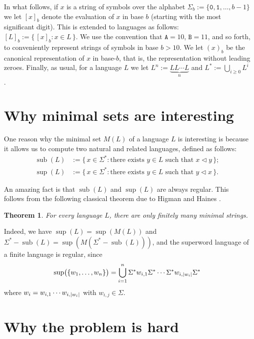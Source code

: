 \documentclass[12pt]{article}
\DeclarePairedDelimiter\abs{\lvert}{\rvert}
\DeclarePairedDelimiter\paren{\lparen}{\rparen}
\def\subw{\mathrel{\triangleleft}}
\DeclareMathOperator\supe{sup}
\DeclareMathOperator\subb{sub}
\theoremstyle{plain}
\newtheorem{theorem}{Theorem}
\theoremstyle{definition}
\theoremstyle{remark}
\newcommand{\0}{\mathtt{0}}
\newcommand{\1}{\mathtt{1}}
\newcommand{\2}{\mathtt{2}}
\newcommand{\3}{\mathtt{3}}
\newcommand{\4}{\mathtt{4}}
\newcommand{\5}{\mathtt{5}}
\newcommand{\6}{\mathtt{6}}
\newcommand{\7}{\mathtt{7}}
\newcommand{\8}{\mathtt{8}}
\newcommand{\9}{\mathtt{9}}
\newcommand{\A}{\mathtt{A}}
\newcommand{\B}{\mathtt{B}}
\newcommand{\set}[2]{\{\,#1{}:{}#2\,\}}
\begin{document}
In what follows, if $x$ is a string of symbols over the alphabet
$\Sigma_b := \lbrace \0, \1, \dotsc, b-1 \rbrace$ we let 
$[x]_b$ denote the evaluation of $x$ in base $b$ (starting with the
most significant digit).  This is extended to languages as follows:
$[L]_b := \set{ [x]_b }{ x \in L }$.
We use the convention that $\A = 10$, $\B = 11$, and so forth,
to conveniently represent strings of symbols in base $b > 10$.
We let $(x)_b$ be the canonical representation
of $x$ in base-$b$, that is, the representation without leading zeroes.
Finally, as usual, for a language $L$ we let
$L^n := \underbrace{LL\dotsm L}_n$ and $L^* := \bigcup_{i \geq 0} L^i$.

\section{Why minimal sets are interesting}

One reason why
the minimal set $M(L)$ of a language $L$ is interesting is because it
allows us to compute two natural and related languages,
defined as follows:
\begin{align*}
\subb(L) &:= \set{x \in \Sigma^*}{\text{there exists $y \in L$ such that $x \subw y$}} ; \\
\supe(L) &:= \set{x \in \Sigma^*}{\text{there exists $y \in L$ such that $y \subw x$}} .
\end{align*}

An amazing fact is that $\subb(L)$ and $\supe(L)$ are always regular.
This follows from
the following classical theorem due to Higman \cite{Hi52} and
Haines \cite{Ha69}.

\begin{theorem}
For every language $L$, there are only finitely many minimal strings.
\end{theorem}

Indeed, we have $\supe(L) = \supe(M(L))$
and $\Sigma^* - \subb(L) = \supe(M(\Sigma^* - \subb(L)))$, and
the superword language of a finite language is regular, since
\[ \supe\paren[\big]{\{w_1,\dotsc,w_n\}} = \bigcup_{i=1}^n \Sigma^* w_{i,1} \Sigma^* \dotsm \Sigma^* w_{i,\abs{w_i}} \Sigma^* \]
where $w_i=w_{i,1}\dotsm w_{i,\abs{w_i}}$ with $w_{i,j}\in\Sigma$.

\section{Why the problem is hard}
\end{document}
